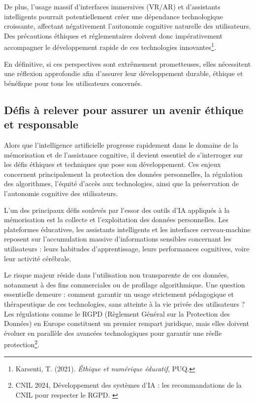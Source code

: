 \documentclass[11pt,a4paper]{report}
\begin{document}
De plus, l’usage massif d’interfaces immersives (VR/AR) et d’assistants intelligents pourrait potentiellement créer une dépendance technologique croissante, affectant négativement l’autonomie cognitive naturelle des utilisateurs. Des précautions éthiques et réglementaires doivent donc impérativement accompagner le développement rapide de ces technologies innovantes\footnote{Karsenti, T. (2021). \textit{Éthique et numérique éducatif}, PUQ.}.

En définitive, si ces perspectives sont extrêmement prometteuses, elles nécessitent une réflexion approfondie afin d’assurer leur développement durable, éthique et bénéfique pour tous les utilisateurs concernés.

\subsection{Défis à relever pour assurer un avenir éthique et responsable}

Alors que l’intelligence artificielle progresse rapidement dans le domaine de la mémorisation et de l’assistance cognitive, il devient essentiel de s’interroger sur les défis éthiques et techniques que pose son développement. Ces enjeux concernent principalement la protection des données personnelles, la régulation des algorithmes, l’équité d’accès aux technologies, ainsi que la préservation de l’autonomie cognitive des utilisateurs.

L’un des principaux défis soulevés par l’essor des outils d’IA appliqués à la mémorisation est la collecte et l’exploitation des données personnelles. Les plateformes éducatives, les assistants intelligents et les interfaces cerveau-machine reposent sur l’accumulation massive d’informations sensibles concernant les utilisateurs : leurs habitudes d’apprentissage, leurs performances cognitives, voire leur activité cérébrale.

Le risque majeur réside dans l’utilisation non transparente de ces données, notamment à des fins commerciales ou de profilage algorithmique. Une question essentielle demeure : comment garantir un usage strictement pédagogique et thérapeutique de ces technologies, sans atteinte à la vie privée des utilisateurs ? Les régulations comme le RGPD (Règlement Général sur la Protection des Données) en Europe constituent un premier rempart juridique, mais elles doivent évoluer en parallèle des avancées technologiques pour garantir une réelle protection\footnote{CNIL 2024, Développement des systèmes d’IA : les recommandations de la CNIL pour respecter le RGPD. \cite{cnil}}.
\end{document}
